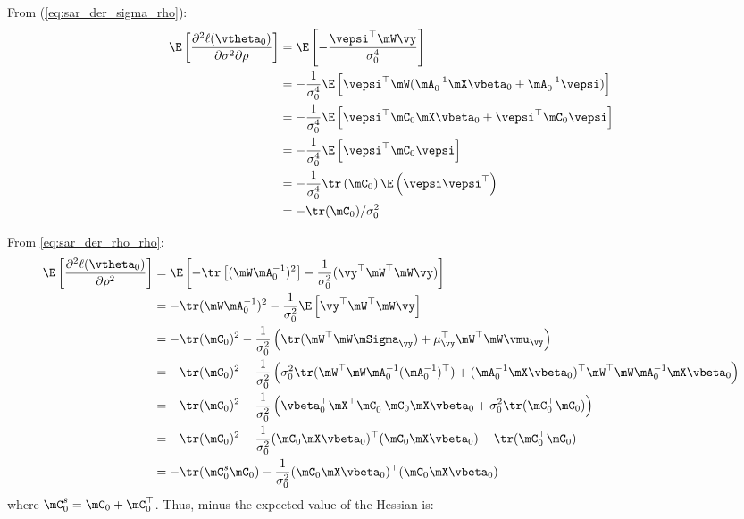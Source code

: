 \begin{subappendices}
From (\ref{eq:sar_der_sigma_rho}):
\begin{equation}\label{eq:E_der_sigma_rho}
	\begin{aligned}
	\E\left[\frac{\partial^2 \ell(\vtheta_0)}{\partial \sigma^2 \partial \rho}\right] &= \E\left[-\frac{\vepsi^\top\mW\vy}{\sigma^4_0}\right] \\
	& = - \frac{1}{\sigma^4_0}\E\left[\vepsi^\top\mW(\mA^{-1}_0\mX\vbeta_0 + \mA^{-1}_0\vepsi)\right] \\
	& = - \frac{1}{\sigma^4_0}\E\left[\vepsi^\top\mC_0\mX\vbeta_0 + \vepsi^\top\mC_0\vepsi\right] \\
	& = - \frac{1}{\sigma^4_0}\E\left[\vepsi^\top\mC_0\vepsi\right] \\
	& = - \frac{1}{\sigma^4_0}\tr\left(\mC_0\right) \E\left(\vepsi\vepsi^\top\right) \\
	& = - \tr(\mC_0)/\sigma^2_0
	\end{aligned}
\end{equation}

From \eqref{eq:sar_der_rho_rho}:
\begin{equation}\label{eq:E_der_rho_rho}
  \begin{aligned}
\E\left[\frac{\partial^2 \ell(\vtheta_0)}{\partial \rho ^2}\right]  & =  \E\left[- \tr\left[(\mW\mA_0^{-1})^2\right] - \frac{1}{\sigma^2_0}(\vy^{\top}\mW^{\top}\mW\vy)\right] \\
  & =  - \tr(\mW\mA^{-1}_0)^2 - \frac{1}{\sigma^2_0} \E\left[\vy^{\top}\mW^{\top}\mW\vy\right] \\
  & = - \tr(\mC_0)^2 -\frac{1}{\sigma^2_0} \left(\tr(\mW^{\top}\mW\mSigma_{\vy}) + \mu_{\vy}^\top\mW^{\top}\mW\vmu_{\vy}\right) \\
  & = - \tr(\mC_0)^2 -\frac{1}{\sigma^2_0}\left(\sigma_0^2\tr(\mW^{\top}\mW\mA_0^{-1}(\mA_0^{-1})^\top) + (\mA_0^{-1}\mX\vbeta_0)^\top\mW^{\top}\mW\mA_0^{-1}\mX\vbeta_0\right) \\
 & = - \tr(\mC_0)^2 - \frac{1}{\sigma^2_0}\left(\vbeta_0^\top\mX^\top\mC_0^\top\mC_0\mX\vbeta_0 + \sigma_0^2\tr(\mC_0^\top\mC_0)\right) \\
 & = - \tr(\mC_0)^2 - \frac{1}{\sigma^2_0}(\mC_0\mX\vbeta_0)^\top(\mC_0\mX\vbeta_0) - \tr(\mC_0^\top\mC_0) \\
 & = - \tr(\mC_0^s\mC_0) - \frac{1}{\sigma^2_0}(\mC_0\mX\vbeta_0)^\top(\mC_0\mX\vbeta_0)
\end{aligned}
\end{equation}
%
where $\mC_0^s = \mC_0 + \mC_0^\top$. Thus, minus the expected value of the Hessian is:


\end{subappendices}
